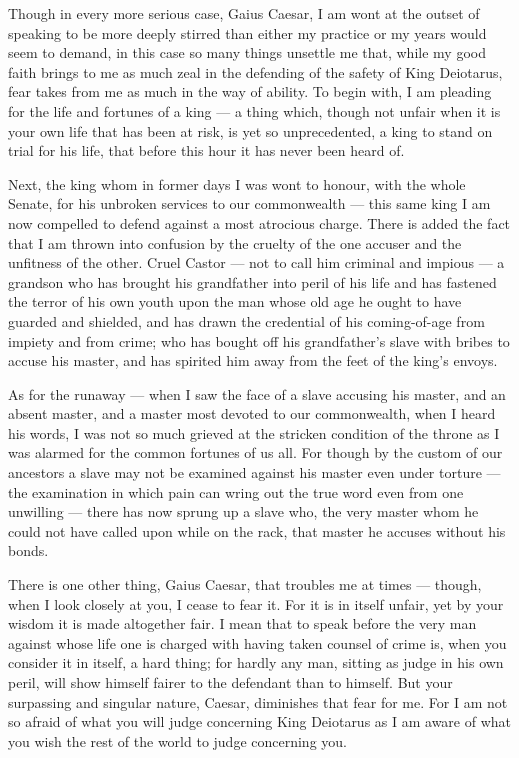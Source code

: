 
 Though in every more serious case, Gaius Caesar, I am wont at the outset of speaking to be more deeply stirred than either my practice or my years would seem to demand, in this case so many things unsettle me that, while my good faith brings to me as much zeal in the defending of the safety of King Deiotarus, fear takes from me as much in the way of ability. To begin with, I am pleading for the life and fortunes of a king --- a thing which, though not unfair when it is your own life that has been at risk, is yet so unprecedented, a king to stand on trial for his life, that before this hour it has never been heard of.

 Next, the king whom in former days I was wont to honour, with the whole Senate, for his unbroken services to our commonwealth --- this same king I am now compelled to defend against a most atrocious charge. There is added the fact that I am thrown into confusion by the cruelty of the one accuser and the unfitness of the other. Cruel Castor --- not to call him criminal and impious --- a grandson who has brought his grandfather into peril of his life and has fastened the terror of his own youth upon the man whose old age he ought to have guarded and shielded, and has drawn the credential of his coming-of-age from impiety and from crime; who has bought off his grandfather's slave with bribes to accuse his master, and has spirited him away from the feet of the king's envoys.

 As for the runaway --- when I saw the face of a slave accusing his master, and an absent master, and a master most devoted to our commonwealth, when I heard his words, I was not so much grieved at the stricken condition of the throne as I was alarmed for the common fortunes of us all. For though by the custom of our ancestors a slave may not be examined against his master even under torture --- the examination in which pain can wring out the true word even from one unwilling --- there has now sprung up a slave who, the very master whom he could not have called upon while on the rack, that master he accuses without his bonds.

 There is one other thing, Gaius Caesar, that troubles me at times --- though, when I look closely at you, I cease to fear it. For it is in itself unfair, yet by your wisdom it is made altogether fair. I mean that to speak before the very man against whose life one is charged with having taken counsel of crime is, when you consider it in itself, a hard thing; for hardly any man, sitting as judge in his own peril, will show himself fairer to the defendant than to himself. But your surpassing and singular nature, Caesar, diminishes that fear for me. For I am not so afraid of what you will judge concerning King Deiotarus as I am aware of what you wish the rest of the world to judge concerning you.

